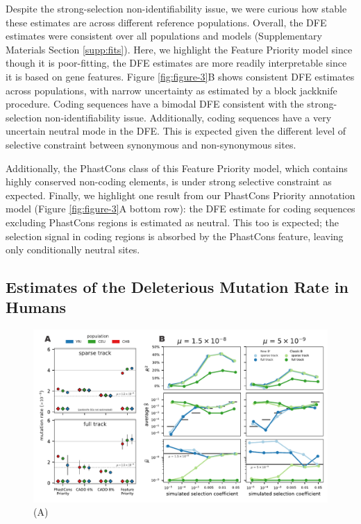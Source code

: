 \documentclass[11pt]{article}
\begin{document}
Despite the strong-selection non-identifiability issue, we were curious how
stable these estimates are across different reference populations. Overall, the
DFE estimates were consistent over all populations and models (Supplementary
Materials Section \ref{supp:fits}). Here, we highlight the Feature Priority
model since though it is poor-fitting, the DFE estimates are more readily
interpretable since it is based on gene features. Figure \ref{fig:figure-3}B
shows consistent DFE estimates across populations, with narrow uncertainty as
estimated by a block jackknife procedure. Coding sequences have a bimodal DFE
consistent with the strong-selection non-identifiability issue. Additionally,
coding sequences have a very uncertain neutral mode in the DFE. This is
expected given the different level of selective constraint between synonymous
and non-synonymous sites. 

Additionally, the PhastCons class of this Feature Priority model, which
contains highly conserved non-coding elements, is under strong selective
constraint as expected. Finally, we highlight one result from our PhastCons
Priority annotation model (Figure \ref{fig:figure-3}A bottom row): the DFE
estimate for coding sequences excluding PhastCons regions is estimated as
neutral. This too is expected; the selection signal in coding regions is
absorbed by the PhastCons feature, leaving only conditionally neutral sites.

\subsection*{Estimates of the Deleterious Mutation Rate in Humans}

\begin{figure}[htbp] 
    \centering
    \includegraphics[width=\textwidth]{figures/figure_5.pdf} 
    \caption{(A) }
  \label{fig:figure-4}
\end{figure}
\end{document}
